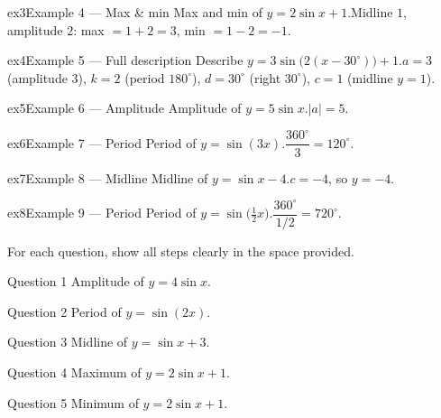 \documentclass[11pt]{article}
\begin{document}
\begin{example}{ex3}{Example 4 --- Max \& min}
Max and min of $y=2\sin x+1$.\soln Midline $1$, amplitude $2$: max $=1+2=3$, min $=1-2=-1$.
\end{example}

\begin{example}{ex4}{Example 5 --- Full description}
Describe $y=3\sin\!\big(2(x-30^\circ)\big)+1$.\soln $a=3$ (amplitude 3), $k=2$ (period $180^\circ$), $d=30^\circ$ (right $30^\circ$), $c=1$ (midline $y=1$).
\end{example}

\begin{example}{ex5}{Example 6 --- Amplitude}
Amplitude of $y=5\sin x$.\soln $|a|=5$.
\end{example}

\begin{example}{ex6}{Example 7 --- Period}
Period of $y=\sin(3x)$.\soln $\dfrac{360^\circ}{3}=120^\circ$.
\end{example}

\begin{example}{ex7}{Example 8 --- Midline}
Midline of $y=\sin x-4$.\soln $c=-4$, so $y=-4$.
\end{example}

\begin{example}{ex8}{Example 9 --- Period}
Period of $y=\sin\!\big(\tfrac12 x\big)$.\soln $\dfrac{360^\circ}{1/2}=720^\circ$.
\end{example}

\clearpage
{}
For each question, show all steps clearly in the space provided.

\begin{qbox}{Question 1}
Amplitude of $y=4\sin x$.\workspace{2.4cm}
\end{qbox}

\begin{qbox}{Question 2}
Period of $y=\sin(2x)$.\workspace{2.4cm}
\end{qbox}

\begin{qbox}{Question 3}
Midline of $y=\sin x+3$.\workspace{2.4cm}
\end{qbox}

\begin{qbox}{Question 4}
Maximum of $y=2\sin x+1$.\workspace{2.4cm}
\end{qbox}

\begin{qbox}{Question 5}
Minimum of $y=2\sin x+1$.\workspace{2.4cm}
\end{qbox}
\end{document}
